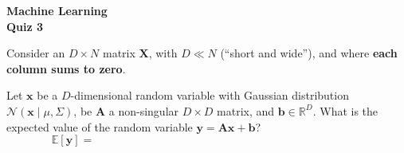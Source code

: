 \documentclass[11pt,noanswers,addpoints]{exam}
\DeclareMathOperator{\var}{var}
\newcommand{\E}{\mathbb E}
\newcommand{\R}{\mathbb R}
\newcommand{\X}{\mathbf X}
\newcommand{\A}{\mathbf A}
\newcommand{\x}{\mathbf x}
\newcommand{\y}{\mathbf y}
\renewcommand{\b}{\mathbf b}
\newcommand{\N}{\mathcal N}
\begin{document}
{\Large{\textbf{Machine Learning}}} \\[2mm]
\textbf{\Huge{Quiz 3}}

\hfill\hfill{}



\begin{questions}
\question Consider an $D\times N$ matrix $\X$, with $D\ll N$ (``short and wide''), and where \textbf{each column sums to zero}. 
\question[1] Let $\x$ be a $D$-dimensional random variable with Gaussian distribution $\N(\x\mid \mu,\Sigma)$, be $\A$ a non-singular $D\times D$ matrix, and $\b\in\R^D$. What is the expected value of the random variable $\y=\A\x + \b$?$$\E[\y]=\qquad\qquad\qquad\qquad\qquad\qquad\qquad\qquad\qquad\qquad\qquad\qquad$$

\end{questions}
\end{document}
